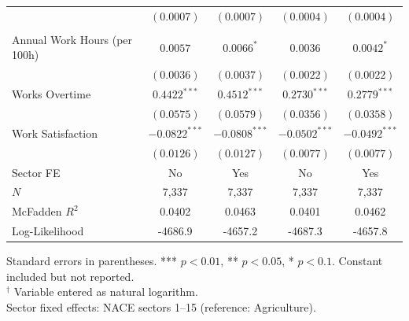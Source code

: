 \begin{table}[htbp]
\begin{tabular}{lcccc}
    \multicolumn{1}{l}{} & $(0.0007)$ & $(0.0007)$ & $(0.0004)$ & $(0.0004)$ \\[2pt]
  \addlinespace
  \multicolumn{5}{l}{\textbf{Labour}} \\
    Annual Work Hours (per 100h) & $0.0057$ & $0.0066^{*}$ & $0.0036$ & $0.0042^{*}$ \\
    \multicolumn{1}{l}{} & $(0.0036)$ & $(0.0037)$ & $(0.0022)$ & $(0.0022)$ \\[2pt]
    Works Overtime & $0.4422^{***}$ & $0.4512^{***}$ & $0.2730^{***}$ & $0.2779^{***}$ \\
    \multicolumn{1}{l}{} & $(0.0575)$ & $(0.0579)$ & $(0.0356)$ & $(0.0358)$ \\[2pt]
    Work Satisfaction & $-0.0822^{***}$ & $-0.0808^{***}$ & $-0.0502^{***}$ & $-0.0492^{***}$ \\
    \multicolumn{1}{l}{} & $(0.0126)$ & $(0.0127)$ & $(0.0077)$ & $(0.0077)$ \\[2pt]
  \midrule
  Sector FE & No & Yes & No & Yes \\
  \midrule
  $N$ & 7,337 & 7,337 & 7,337 & 7,337 \\
  McFadden $R^2$ & 0.0402 & 0.0463 & 0.0401 & 0.0462 \\
  Log-Likelihood & -4686.9 & -4657.2 & -4687.3 & -4657.8 \\
  \bottomrule
\end{tabular}
\smallskip
\parbox{\linewidth}{
\footnotesize Standard errors in parentheses. *** $p<0.01$, ** $p<0.05$, * $p<0.1$. Constant included but not reported. \\
\footnotesize $^\dagger$ Variable entered as natural logarithm. \\
\footnotesize Sector fixed effects: NACE sectors 1--15 (reference: Agriculture).
}
\end{table}
